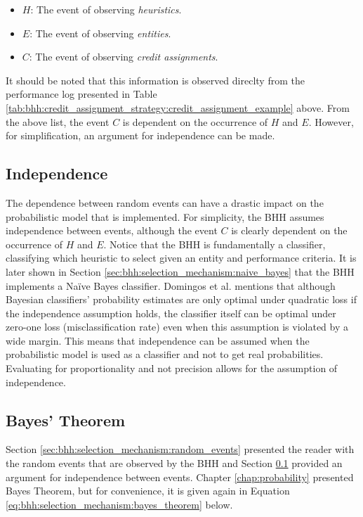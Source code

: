\begin{itemize}
    \item \textbf{$H$}: The event of observing \textit{heuristics}.
    \item \textbf{$E$}: The event of observing \textit{entities}. 
    \item \textbf{$C$}: The event of observing \textit{credit assignments}.
\end{itemize}

It should be noted that this information is observed direclty from the performance log presented in Table \ref{tab:bhh:credit_assignment_strategy:credit_assignment_example} above. From the above list, the event $C$ is dependent on the occurrence of $H$ and $E$. However, for simplification, an argument for independence can be made.

\subsection{Independence}
\label{sec:bhh:selection_mechanism:independence}

The dependence between random events can have a drastic impact on the probabilistic model that is implemented. For simplicity, the \ac{BHH} assumes independence between events, although the event $C$ is clearly dependent on the occurrence of $H$ and $E$. Notice that the \ac{BHH} is fundamentally a classifier, classifying which heuristic to select given an entity and performance criteria. It is later shown in Section \ref{sec:bhh:selection_mechanism:naive_bayes} that the \ac{BHH} implements a Naïve Bayes classifier. Domingos et al. \cite{ref:domingos:1997} mentions that although Bayesian classifiers’ probability estimates are only optimal under quadratic loss if the independence assumption holds, the classifier itself can be optimal under zero-one loss (misclassification rate) even when this assumption is violated by a wide margin. This means that independence can be assumed when the probabilistic model is used as a classifier and not to get real probabilities. Evaluating for proportionality and not precision allows for the assumption of independence.

\subsection{Bayes' Theorem}
\label{sec:bhh:selection_mechanism:bayes_theorem}

Section \ref{sec:bhh:selection_mechanism:random_events} presented the reader with the random events that are observed by the \ac{BHH} and Section \ref{sec:bhh:selection_mechanism:independence} provided an argument for independence between events. Chapter \ref{chap:probability} presented Bayes Theorem, but for convenience, it is given again in Equation \ref{eq:bhh:selection_mechanism:bayes_theorem} below.

